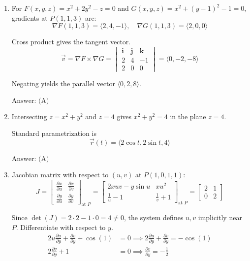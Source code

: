 \documentclass[a4paper, 12pt]{article}
\begin{document}
\begin{enumerate}[leftmargin=*,label=\textbf{\arabic*.}]
$\boxed{\text{Answer: (A)}}$

\item For $F(x,y,z) = x^2 + 2y^2 - z = 0$ and $G(x,y,z) = x^2 + (y-1)^2 - 1 = 0$, gradients at $P(1,1,3)$ are:
\[\nabla F(1,1,3)=\langle 2, 4, -1 \rangle, \quad \nabla G(1,1,3) = \langle 2, 0, 0 \rangle\]

Cross product gives the tangent vector.
\[\vec{v} = \nabla F \times \nabla G = \begin{vmatrix} \mathbf{i} & \mathbf{j} & \mathbf{k} \\ 2 & 4 & -1 \\ 2 & 0 & 0 \end{vmatrix} = \langle 0, -2, -8 \rangle\]

Negating yields the parallel vector $\langle 0, 2, 8 \rangle$.

$\boxed{\text{Answer: (A)}}$

\item Intersecting $z = x^2 + y^2$ and $z = 4$ gives $x^2 + y^2 = 4$ in the plane $z = 4$.

Standard parametrization is
\[\vec{r}(t)=\langle2\cos t,2\sin t,4\rangle\]

$\boxed{\text{Answer: (A)}}$

\item Jacobian matrix with respect to $(u,v)$ at $P(1,0,1,1)$:
\[J = \begin{bmatrix} \frac{\partial x}{\partial u} & \frac{\partial x}{\partial v} \\[1em] \frac{\partial y}{\partial u} & \frac{\partial y}{\partial v} \end{bmatrix}_{\text{at } P}  = \begin{bmatrix} 2xuv - y\sin u & xu^2 \\ \frac{1}{u} - 1 & \frac{1}{v} + 1 \end{bmatrix}_{\text{at } P} = \begin{bmatrix} 2 & 1 \\ 0 & 2 \end{bmatrix}\]

Since $\det(J)=2\cdot2-1\cdot0=4\neq0$, the system defines $u, v$ implicitly near $P$. Differentiate with respect to $y$.
\begin{align*}
    2u \frac{\partial u}{\partial y} + \frac{\partial v}{\partial y} + \cos(1) &= 0 \implies 2\frac{\partial u}{\partial y} + \frac{\partial v}{\partial y} = -\cos(1) \\
    2\frac{\partial v}{\partial y} + 1 &= 0 \implies \frac{\partial v}{\partial y} = -\frac{1}{2}
\end{align*}


\end{enumerate}
\end{document}
